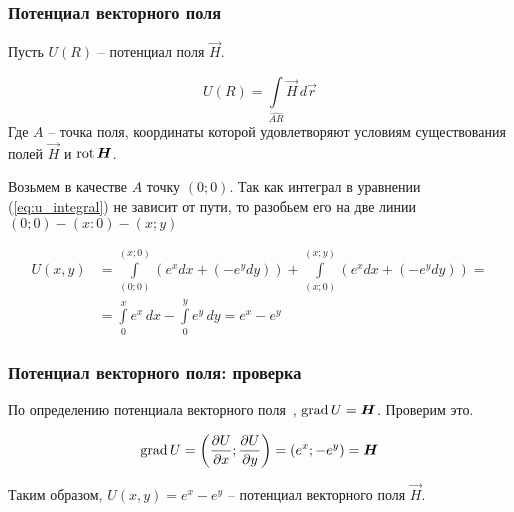 \begin{frame}\frametitle{Потенциал векторного поля}
	Пусть \(U(R)\) -- потенциал поля \(\vec H\).

	\begin{equation*}
		U(R) =
		\int\limits_{\widehat{AR}} \vec H \, d \vec r
		\label{eq:u_integral}
	\end{equation*}
	Где $A$ -- точка поля, координаты которой удовлетворяют условиям
	существования полей $\vec H$ и $\rot \vec H$.

	Возьмем в качестве $A$ точку $(0; 0)$.
	Так как интеграл в уравнении (\ref{eq:u_integral}) не зависит от пути,
	то разобьем его на две линии $(0; 0) - (x: 0) - (x; y)$

	\begin{align*}
		U(x, y) & = \int\limits_{(0; 0)}^{(x; 0)} \left(e^x dx + (-e^y dy) \right) +
		\int\limits_{(x; 0)}^{(x; y)} \left(e^x dx + (-e^y dy) \right) =      \\
		     & =
		\int\limits_{0}^{x} e^x \, dx - \int\limits_{0}^{y} e^y \, dy =
		e^{x} - e^{y}
	\end{align*}

\end{frame}

\begin{frame}\frametitle{Потенциал векторного поля: проверка}
	По определению потенциала векторного поля~\cite[ст.~269]{zorich}, $\grad U = \vec H$. Проверим это.

	\begin{equation*}
		\grad U =
		\left( \frac{\partial U}{\partial x}; \frac{\partial U}{\partial y} \right) =
		\left( e^x; -e^y \right)
		= \vec H
	\end{equation*}

	Таким образом, \(U(x,y) = e^{x} - e^{y}\) -- потенциал векторного поля \(\vec H\).
\end{frame}

